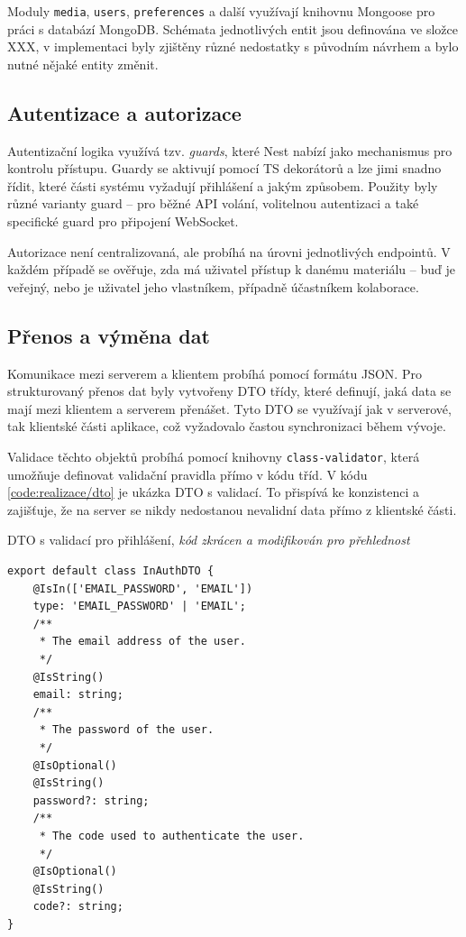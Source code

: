 Moduly \texttt{media}, \texttt{users}, \texttt{preferences} a další využívají knihovnu Mongoose pro práci s databází MongoDB. 
Schémata jednotlivých entit jsou definována ve složce XXX, v implementaci byly zjištěny různé nedostatky s původním návrhem a bylo nutné nějaké entity změnit.

\subsection{Autentizace a autorizace}

Autentizační logika využívá tzv. \emph{guards}, které Nest nabízí jako mechanismus pro kontrolu přístupu.
Guardy se aktivují pomocí TS dekorátorů a lze jimi snadno řídit, které části systému vyžadují přihlášení a jakým způsobem. 
Použity byly různé varianty guard -- pro běžné API volání, volitelnou autentizaci a také specifické guard pro připojení WebSocket.

Autorizace není centralizovaná, ale probíhá na úrovni jednotlivých endpointů. 
V každém případě se ověřuje, zda má uživatel přístup k danému materiálu -- buď je veřejný, nebo je uživatel jeho vlastníkem, případně účastníkem kolaborace.

\subsection{Přenos a výměna dat}

Komunikace mezi serverem a klientem probíhá pomocí formátu JSON.
Pro strukturovaný přenos dat byly vytvořeny DTO třídy, které definují, jaká data se mají mezi klientem a serverem přenášet. 
Tyto DTO se využívají jak v serverové, tak klientské části aplikace, což vyžadovalo častou synchronizaci během vývoje.

Validace těchto objektů probíhá pomocí knihovny \texttt{class-validator}, která umožňuje definovat validační pravidla přímo v kódu tříd.
V kódu \ref{code:realizace/dto} je ukázka DTO s validací.
To přispívá ke konzistenci a zajišťuje, že na server se nikdy nedostanou nevalidní data přímo z klientské části.


\begin{listing}[ht!]
\caption[DTO s validací pro přihlášení]{DTO s validací pro přihlášení, \textit{kód zkrácen a modifikován pro přehlednost}}\label{code:realizace/dto}
\begin{verbatim}
export default class InAuthDTO {
    @IsIn(['EMAIL_PASSWORD', 'EMAIL'])
    type: 'EMAIL_PASSWORD' | 'EMAIL';
    /**
     * The email address of the user.
     */
    @IsString()
    email: string;
    /**
     * The password of the user.
     */
    @IsOptional()
    @IsString()
    password?: string;
    /**
     * The code used to authenticate the user.
     */
    @IsOptional()
    @IsString()
    code?: string;
}
\end{verbatim}
\end{listing}


